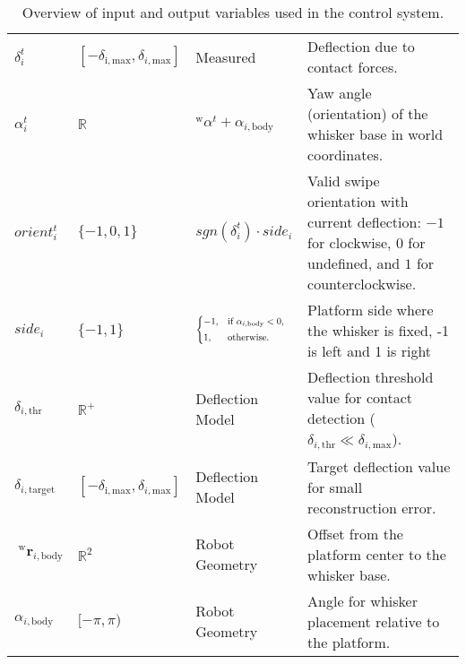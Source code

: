\begin{table}[htb]
\begin{tabular}{p{1cm} p{2cm} p{3cm} p{8cm}}
        \midrule
        \(\delta_{i}^{t}\)                                   & \([-\delta_{\mathrm{i, \mathrm{max}}},\delta_{i, \mathrm{max}}]\) & Measured                                                & Deflection due to contact forces.                                                                                           \\
        \(\alpha_{i}^{t}\)                                   & \(\mathbb{R}\)                                                    & \(^{\mathrm{w}}\alpha^{t} + \alpha_{i, \mathrm{body}}\) & Yaw angle (orientation) of the whisker base in world coordinates.                                                           \\
        \(orient_{i}^{t}\)                                   & \(\{-1, 0, 1\}\)                                                  & \(sgn(\delta_{i}^{t}) \cdot side_{i}\)                  & Valid swipe orientation with current deflection: \(-1\) for clockwise, \(0\) for undefined, and \(1\) for counterclockwise. \\
        \(side_{i}\)                                         & \(\{-1, 1\}\)                                                     & \(\branch{\alpha_{i,\mathrm{body}} < 0}{-1}{1}\)        & Platform side where the whisker is fixed, -1 is left and 1 is right                                                         \\
        \(\delta_{i, \mathrm{thr}}\)                         & \(\mathbb{R}^{+}\)                                                & Deflection Model                                        & Deflection threshold value for contact detection (\(\delta_{i, \mathrm{thr}}\ll\delta_{i, \mathrm{max}}\)).                 \\
        \(\delta_{i, \mathrm{target}}\)                      & \([-\delta_{\mathrm{i, max}},\delta_{i, \mathrm{max}}]\)          & Deflection Model                                        & Target deflection value for small reconstruction error.                                                                     \\
        \(\;^{\mathrm{w}}\boldsymbol{r}_{i, \mathrm{body}}\) & \(\mathbb{R}^2\)                                                  & Robot Geometry                                          & Offset from the platform center to the whisker base.                                                                        \\
        \(\alpha_{i, \mathrm{body}}\)                        & \([-\pi,\pi)\)                                                    & Robot Geometry                                          & Angle for whisker placement relative to the platform.                                                                       \\
        \bottomrule
    \end{tabular}
    \caption{Overview of input and output variables used in the control system.}
    \label{tab:variables}
\end{table}

